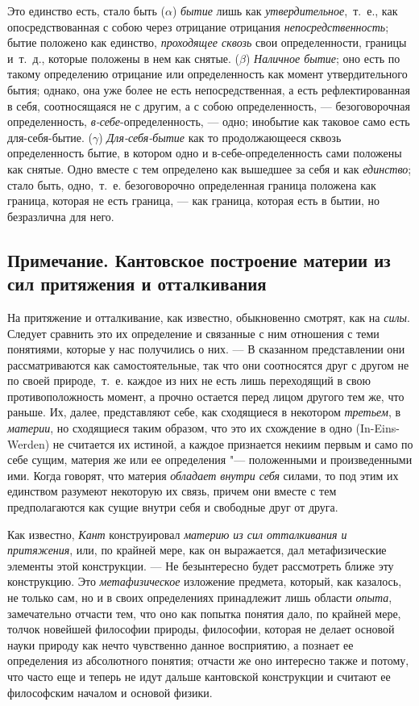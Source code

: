 Это единство есть, стало быть ($\alpha $) {\em бытие}
лишь как {\em утвердительное},~т.~е., как
опосредствованная с собою через отрицание отрицания
{\em непосредственность}; бытие положено как единство,
{\em проходящее сквозь} свои определенности, границы
и~т.~д., которые положены в нем как снятые. ($\beta $)
{\em Наличное бытие}; оно есть по такому определению
отрицание или определенность как момент утвердительного бытия; однако, она
уже более не есть непосредственная, а есть рефлектированная в себя,
соотносящаяся не с другим, а с собою определенность, — безоговорочная
определенность, {\em в-себе}{}-определенность, — одно;
инобытие как таковое само есть для-себя-бытие. ($\gamma $)
{\em Для-себя-бытие} как то продолжающееся сквозь
определенность бытие, в котором одно и в-себе-определенность сами положены
как снятые. Одно вместе с тем определено как вышедшее за себя и как
{\em единство}; стало быть, одно,~т.~е. безоговорочно
определенная граница положена как граница, которая не есть граница, — как
граница, которая есть в бытии, но безразлична для него.

\subsection*{Примечание. Кантовское построение материи из
сил притяжения и отталкивания}

На притяжение и отталкивание, как известно, обыкновенно смотрят, как на
{\em силы}. Следует сравнить это их определение и
связанные с ним отношения с теми понятиями, которые у нас получились о них.
— В сказанном представлении они рассматриваются как самостоятельные, так
что они соотносятся друг с другом не по своей природе,~т.~е. каждое из них
не есть лишь переходящий в свою противоположность момент, а прочно остается
перед лицом другого тем же, что раньше. Их, далее, представляют себе, как
сходящиеся в некотором {\em третьем}, в
{\em материи}, но сходящиеся таким образом, что это их
схождение в одно (In-Eins-Werden) не считается их истиной, а каждое
признается некиим первым и само по себе сущим, материя же или ее
определения "--- положенными и произведенными ими. Когда говорят, что материя
{\em обладает внутри себя} силами, то под этим их
единством разумеют некоторую их связь, причем они вместе с тем
предполагаются как сущие внутри себя и свободные друг от друга.

Как известно, {\em Кант} конструировал
{\em материю из сил отталкивания и притяжения}, или, по
крайней мере, как он выражается, дал метафизические элементы этой
конструкции. — Не безынтересно будет рассмотреть ближе эту конструкцию. Это
{\em метафизическое} изложение предмета, который, как
казалось, не только сам, но и в своих определениях принадлежит лишь области
{\em опыта}, замечательно отчасти тем, что оно как
попытка понятия дало, по крайней мере, толчок новейшей философии природы,
философии, которая не делает основой науки природу как нечто чувственно
данное восприятию, а познает ее определения из абсолютного понятия; отчасти
же оно интересно также и потому, что часто еще и теперь не идут дальше
кантовской конструкции и считают ее философским началом и основой физики.

